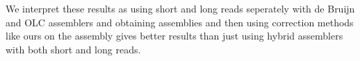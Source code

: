 \documentclass[12pt]{article}
\begin{document}
We interpret these results as using short and long reads seperately with de Bruijn and OLC assemblers and obtaining assemblies and then using correction methods like ours on the assembly gives better results than just using hybrid assemblers with both short and long reads.


       {
       }
\end{document}
